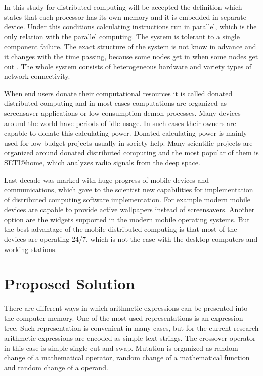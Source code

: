 \documentclass[graybox]{svmult}
\begin{document}
In this study for distributed computing will be accepted the definition which states that each processor has its own memory and it is embedded in separate device. Under this conditions calculating instructions run in parallel, which is the only relation with the parallel computing. The system is tolerant to a single component failure. The exact structure of the system is not know in advance and it changes with the time passing, because some nodes get in when some nodes get out \cite{balabanov02}. The whole system consists of heterogeneous hardware and variety types of network connectivity. 

When end users donate their computational resources it is called donated distributed computing and in most cases computations are organized as screensaver applications or low consumption demon processes. Many devices around the world have periods of idle usage. In such cases their owners are capable to donate this calculating power. Donated calculating power is mainly used for low budget projects usually in society help. Many scientific projects are organized around donated distributed computing and the most popular of them is SETI@home, which analyzes radio signals from the deep space. 

Last decade was marked with huge progress of mobile devices and communications, which gave to the scientist new capabilities for implementation of distributed computing software implementation. For example modern mobile devices are capable to provide active wallpapers instead of screensavers. Another option are the widgets supported in the modern mobile operating systems. But the best advantage of the mobile distributed computing is that most of the devices are operating 24/7, which is not the case with the desktop computers and working stations. 

\section{Proposed Solution} \label{Proposed Solution}

There are different ways in which arithmetic expressions can be presented into the computer memory. One of the most used representations is an expression tree. Such representation is convenient in many cases, but for the current research arithmetic expressions are encoded as simple text strings. The crossover operator in this case is simple single cut and swap. Mutation is organized as random change of a mathematical operator, random change of a mathematical function and random change of a operand. 
\end{document}

